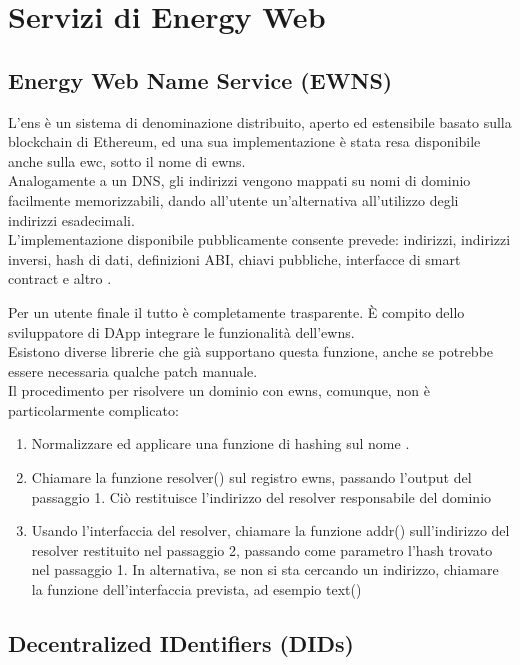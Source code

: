 \chapter{Servizi di Energy Web}

\section{Energy Web Name Service (EWNS)}
\label{sec:ewns}

L'\gls{ens} è un sistema di denominazione distribuito, aperto ed estensibile basato sulla blockchain di Ethereum, ed una sua implementazione è stata resa disponibile anche sulla \gls{ewc}, sotto il nome di \gls{ewns}. \\
Analogamente a un DNS, gli indirizzi vengono mappati su nomi di dominio facilmente memorizzabili, dando all'utente un'alternativa all'utilizzo degli indirizzi esadecimali. \\
L'implementazione disponibile pubblicamente consente prevede: indirizzi, indirizzi inversi, hash di dati, definizioni ABI, chiavi pubbliche, interfacce di smart contract e altro \cite{wiki:ewns}.

Per un utente finale il tutto è completamente trasparente. 
È compito dello sviluppatore di DApp integrare le funzionalità dell'\gls{ewns}. \\
Esistono diverse librerie che già supportano questa funzione, anche se potrebbe essere necessaria qualche patch manuale. \\
Il procedimento per risolvere un dominio con \gls{ewns}, comunque, non è particolarmente complicato:

\begin{enumerate}
    \item Normalizzare ed applicare una funzione di hashing sul nome \cite{wiki:ens-normalize-name}.
    \item Chiamare la funzione resolver() sul registro \gls{ewns}, passando l'output del passaggio 1. Ciò restituisce l'indirizzo del resolver responsabile del dominio
    \item Usando l'interfaccia del resolver, chiamare la funzione addr() sull'indirizzo del resolver restituito nel passaggio 2, passando come parametro l'hash trovato nel passaggio 1. In alternativa, se non si sta cercando un indirizzo, chiamare la funzione dell'interfaccia prevista, ad esempio text()
\end{enumerate}

\section{Decentralized IDentifiers (DIDs)}
\label{sec:did}

